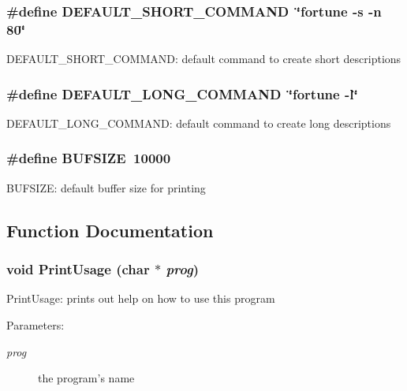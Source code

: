 \subsubsection{\setlength{\rightskip}{0pt plus 5cm}\#define DEFAULT\_\-SHORT\_\-COMMAND\ \char`\"{}fortune -s -n 80\char`\"{}}\label{cmml-fortune_8c_a2}


DEFAULT\_\-SHORT\_\-COMMAND: default command to create short descriptions 
\subsubsection{\setlength{\rightskip}{0pt plus 5cm}\#define DEFAULT\_\-LONG\_\-COMMAND\ \char`\"{}fortune -l\char`\"{}}\label{cmml-fortune_8c_a3}


DEFAULT\_\-LONG\_\-COMMAND: default command to create long descriptions 
\subsubsection{\setlength{\rightskip}{0pt plus 5cm}\#define BUFSIZE\ 10000}\label{cmml-fortune_8c_a4}


BUFSIZE: default buffer size for printing 

\subsection{Function Documentation}
\subsubsection{\setlength{\rightskip}{0pt plus 5cm}void Print\-Usage (char $\ast$ {\em prog})\hspace{0.3cm}{\tt  [static]}}\label{cmml-fortune_8c_a5}


Print\-Usage: prints out help on how to use this program

\begin{Desc}
\item[Parameters:]
\begin{description}
\item[{\em prog}]the program's name \end{description}
\end{Desc}
